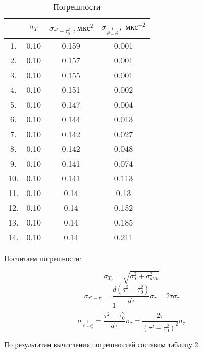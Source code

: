 \documentclass[a4paper,13pt]{article}
\begin{document}
	\begin{wraptable}{l}{0.5\linewidth}
		\caption{Погрешности}
		\begin{tabular}{|c|c|c|c|}
			\hline
			\text{№} & $ \sigma_{T}  $ & $  \sigma_{\tau^{2} - \tau_0^{2}} $ $,  мкс^{2}  $ &  $ \sigma_{\frac{1}{\tau^2 - \tau_0^2}} $, $ мкс^{-2}  $ \\
			\hline
			1. & 0.10 & 0.159 & 0.001 \\
			2. & 0.10 & 0.157 & 0.001 \\
			3. & 0.10 & 0.155 & 0.001 \\
			4. & 0.10 & 0.151 & 0.002 \\
			5. & 0.10 & 0.147 & 0.004 \\
			6. & 0.10 & 0.144 & 0.013 \\
			7. & 0.10 & 0.142 & 0.027 \\
			8. & 0.10 & 0.142 & 0.048 \\
			9. & 0.10 & 0.141 & 0.074 \\
			10. & 0.10 & 0.141 & 0.113 \\
			11. & 0.10 & 0.14 & 0.13 \\
			12. & 0.10 & 0.14 & 0.152 \\
			13. & 0.10 & 0.14 & 0.185 \\
			14. & 0.10 & 0.14 & 0.211 \\
			\hline
		\end{tabular}
	\end{wraptable}
	Посчитаем погрешности: 
	
	$$
	\sigma_{T_o} = \sqrt{\sigma_{T}^2 + \sigma_{dUk}^2}
	$$
	\begin{equation}\label{}
	\sigma_{\tau^2 - \tau_0^2} = \dfrac{d(\tau^2 - \tau_0^2)}{d\tau}\sigma_\tau = 2\tau\sigma_\tau
	\end{equation}
	\begin{equation}\label{}
	\sigma_{\frac{1}{\tau^2 - \tau_0^2}} = \dfrac{\dfrac{1}{\tau^2 - \tau_0^2}}{d\tau}\sigma_\tau = \dfrac{2\tau}{{(\tau^2 - \tau_0^2)^2}}\sigma_\tau
	\end{equation}
	
	По результатам вычисления погрешностей составим таблицу 2.
   
    
   
\end{document}
